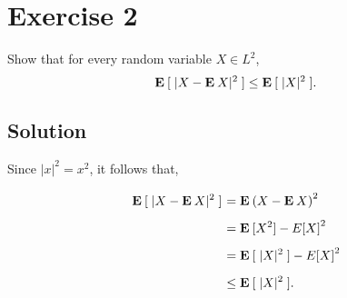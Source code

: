 \section{Exercise 2}
Show that for every random variable $X \in L^2$,
\[ \mathbf{E}\:[\; |X-\mathbf{E}\: X|^2 \;]\leq \mathbf{E}\: [\; |X|^2 \;] . \]

\subsection*{Solution}
Since $|x|^2 = x^2$, it follows that,
\[ \everymath{\displaystyle}
\arraycolsep=1.8pt\def\arraystretch{1.8}
\begin{array}{rl}
    \E[\; |X-\E X|^2 \;] & = \E {(X-\E X)}^2\\
    & = \E[X^2] - E{[X]}^2\\
    & = \E[\; |X|^2 \;] - E{[X]}^2\\
    & \leq \E[\; |X|^2 \;] .
\end{array} \]